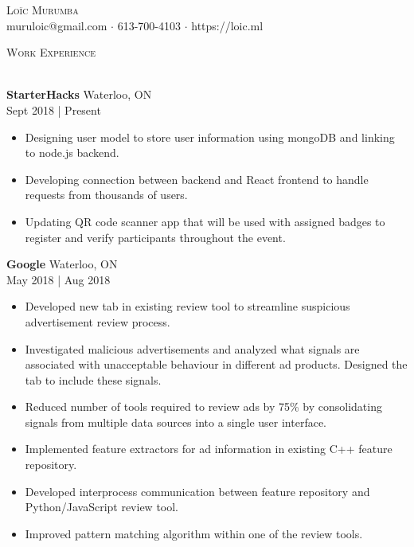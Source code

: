\documentclass[a4paper]{article}
\newcommand{\lineunder} {
    \vspace*{-8pt} \\
    \hspace*{-18pt} \hrulefill \\
}
\newcommand{\header} [1] {
    {\hspace*{-18pt}\vspace*{6pt} \textsc{#1}}
    \vspace*{-6pt} \lineunder
}
\begin{document}
\vspace*{-40pt}

    

\vspace*{-10pt}
\begin{center}
	{\Huge \scshape {Loïc Murumba}}\\
	muruloic@gmail.com $\cdot$ 613-700-4103 $\cdot$ https://loic.ml\\
\end{center}

\header{Work Experience}
\vspace{1mm}

\textbf{StarterHacks} \hfill Waterloo, ON\\
 \hfill Sept 2018 | Present\\
\vspace{-1mm}
\begin{itemize} \itemsep 1pt
    \item Designing user model to store user information using mongoDB and linking to node.js backend.
    \item Developing connection between backend and React frontend to handle requests from thousands of users.
    \item Updating QR code scanner app that will be used with assigned badges to register and verify participants throughout the event.
\end{itemize}


\textbf{Google} \hfill Waterloo, ON\\
 \hfill May 2018 | Aug 2018\\
\vspace{-1mm}
\begin{itemize} \itemsep 1pt
	\item Developed new tab in existing review tool to streamline suspicious advertisement review process.
    \item Investigated malicious advertisements and analyzed what signals are associated with unacceptable behaviour in different ad products. Designed the tab to include these signals.
    \item Reduced number of tools required to review ads by 75\% by consolidating signals from multiple data sources into a single user interface.
	\item Implemented feature extractors for ad information in existing C++ feature repository.
	\item Developed interprocess communication between feature repository and Python/JavaScript review tool.
	\item Improved pattern matching algorithm within one of the review tools.
\end{itemize}
\end{document}
